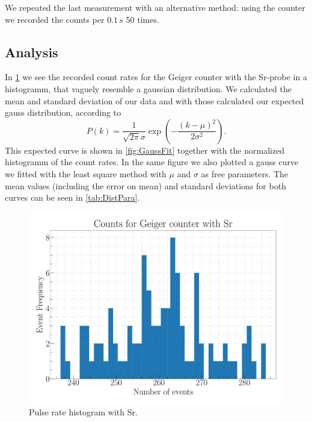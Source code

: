 We repeated the last measurement with an alternative method: using the counter we recorded the counts per $0.1\,s$ 50 times.

\subsection{Analysis}

In \cref{fig:GaussHist} we see the recorded count rates for the Geiger counter with the Sr-probe in a histogramm, that vaguely resemble a gaussian distribution. We calculated the mean and standard deviation of our data and with those calculated our expected gauss distribution, according to
\begin{equation}
P(k) = \frac{1}{\sqrt{2\pi}\sigma} \exp(-\frac{(k-\mu)^2}{2\sigma^2}).
\end{equation}
This expected curve is shown in \cref{fig:GaussFit} together with the normalized histogramm of the count rates. In the same figure we also plotted a gauss curve we fitted with the least square method with $\mu$ and $\sigma$ as free parameters. The mean values (including the error on mean) and standard deviations for both curves can be seen in \cref{tab:DistPara}.

\begin{figure}[H]
\centering
\includegraphics[width=\textwidth]{../Figures/Geiger_gauss_histogram.pdf}
\caption{Pulse rate histogram with Sr.}
\label{fig:GaussHist}
\end{figure}

